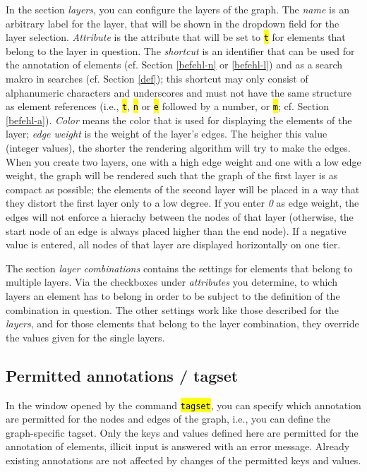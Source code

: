 \documentclass[12pt]{scrartcl}
\newcommand{\code}[1]{\hl{\texttt{#1}}}
\begin{document}
In the section \textit{layers}, you can configure the layers of the graph.
The \textit{name} is an arbitrary label for the layer, that will be shown in the dropdown field for the layer selection.
\textit{Attribute} is the attribute that will be set to \code{t} for elements that belong to the layer in question.
The \textit{shortcut} is an identifier that can be used for the annotation of elements (cf. Section \ref{befehl-n} or \ref{befehl-l}) and as a search makro in searches (cf. Section \ref{def}); this shortcut may only consist of alphanumeric characters and underscores and must not have the same structure as element references (i.e., \code{t}, \code{n} or \code{e} followed by a number, or  \code{m}; cf. Section \ref{befehl-a}).
\textit{Color} means the color that is used for displaying the elements of the layer; \textit{edge weight} is the weight of the layer’s edges.
The heigher this value (integer values), the shorter the rendering algorithm will try to make the edges.
When you create two layers, one with a high edge weight and one with a low edge weight, the graph will be rendered such that the graph of the first layer is as compact as possible; the elements of the second layer will be placed in a way that they distort the first layer only to a low degree.
If you enter \textit{0} as edge weight, the edges will not enforce a hierachy between the nodes of that layer (otherwise, the start node of an edge is always placed higher than the end node).
If a negative value is entered, all nodes of that layer are displayed horizontally on one tier.

The section \textit{layer combinations} contains the settings for elements that belong to multiple layers.
Via the checkboxes under \textit{attributes} you determine, to which layers an element has to belong in order to be subject to the definition of the combination in question.
The other settings work like those described for the \textit{layers}, and for those elements that belong to the layer combination, they override the values given for the single layers.


\subsection{Permitted annotations / tagset}\label{erlaubteannotationen}

In the window opened by the command \code{tagset}, you can specify which annotation are permitted for the nodes and edges of the graph, i.e., you can define the graph-specific tagset.
Only the keys and values defined here are permitted for the annotation of elements, illicit input is answered with an error message.
Already existing annotations are not affected by changes of the permitted keys and values.
\end{document}
